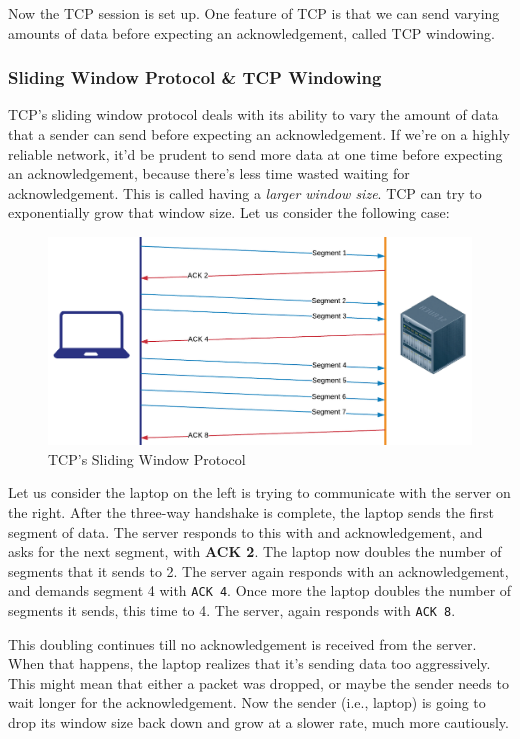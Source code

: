 \noindent
Now the TCP session is set up. One feature of TCP is that we can send varying amounts of data before expecting an acknowledgement, called TCP windowing.

\subsubsection{Sliding Window Protocol \& TCP Windowing}
TCP's sliding window protocol deals with its ability to vary the amount of data that a sender can send before expecting an acknowledgement. If we're on a highly reliable network, it'd be prudent to send more data at one time before expecting an acknowledgement, because there's less time wasted waiting for acknowledgement. This is called having a \textit{larger window size}. TCP can try to exponentially grow that window size. Let us consider the following case:

\begin{figure}[H]
	\centering
	\includegraphics[width=0.9\linewidth]{"Mod1/chapters/1.1.e Sliding Window"}
	\caption{TCP's Sliding Window Protocol}
	\label{fig:1 TCP's Sliding Window Protocol}
\end{figure}

\noindent
Let us consider the laptop on the left is trying to communicate with the server on the right. After the three-way handshake is complete, the laptop sends the first segment of data. The server responds to this with and acknowledgement, and asks for the next segment, with \textbf{ACK 2}. The laptop now doubles the number of segments that it sends to 2. The server again responds with an acknowledgement, and demands segment 4 with \verb|ACK 4|. Once more the laptop doubles the number of segments it sends, this time to 4. The server, again responds with \verb|ACK 8|. 

This doubling continues till no acknowledgement is received from the server. When that happens, the laptop realizes that it's sending data too aggressively. This might mean that either a packet was dropped, or maybe the sender needs to wait longer for the acknowledgement. Now the sender (i.e., laptop) is going to drop its window size back down and grow at a slower rate, much more cautiously. 

